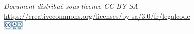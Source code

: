 \vspace*{1cm}
\begin{minipage}{0.5\linewidth}
\hfill
\end{minipage}
\begin{minipage}{0.5\linewidth}
\end{minipage}
\begin{minipage}{\linewidth}
\vspace{3cm}
\centering
\textit{Document distribué sous licence CC-BY-SA}\\\url{https://creativecommons.org/licenses/by-sa/3.0/fr/legalcode}
\\\includegraphics[width=1cm]{cc-by-sa}
\end{minipage}